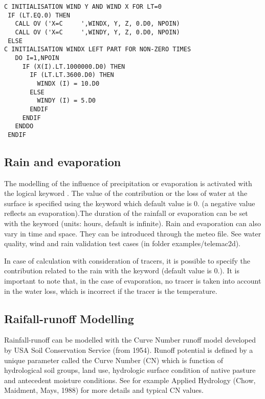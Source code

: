 \begin{lstlisting}[language=TelFortran]
C INITIALISATION WIND Y AND WIND X FOR LT=0
 IF (LT.EQ.0) THEN
   CALL OV ('X=C     ',WINDX, Y, Z, 0.D0, NPOIN)
   CALL OV ('X=C     ',WINDY, Y, Z, 0.D0, NPOIN)
 ELSE
C INITIALISATION WINDX LEFT PART FOR NON-ZERO TIMES
   DO I=1,NPOIN
     IF (X(I).LT.1000000.D0) THEN
       IF (LT.LT.3600.D0) THEN
         WINDX (I) = 10.D0
       ELSE
         WINDY (I) = 5.D0
       ENDIF
     ENDIF
   ENDDO
 ENDIF
\end{lstlisting}
\subsection{ Rain and evaporation}

 The modelling of the influence of precipitation or evaporation is activated with the logical keyword . The value of the contribution or the loss of water at the surface is specified using the keyword  which default value is 0. (a negative value reflects an evaporation).The duration of the rainfall or evaporation can be set with the keyword  (units: hours, default is infinite). Rain and evaporation can also vary in time and space. They can be introduced through the meteo file. See water quality, wind and rain validation test cases (in folder examples/telemac2d).

 In case of calculation with consideration of tracers, it is possible to specify the contribution related to the rain with the keyword  (default value is 0.). It is important to note that, in the case of evaporation, no tracer is taken into account in the water loss, which is incorrect if the tracer is the temperature.

\subsection{Raifall-runoff Modelling}

Rainfall-runoff can be modelled with the Curve Number runoff model developed by USA Soil Conservation Service (from 1954). Runoff potential is defined by a unique parameter called the Curve Number (CN) which is function of hydrological soil groups, land use, hydrologic surface condition of native pasture and antecedent moisture conditions. See for example Applied Hydrology (Chow, Maidment, Mays, 1988) for more details and typical CN values. 

